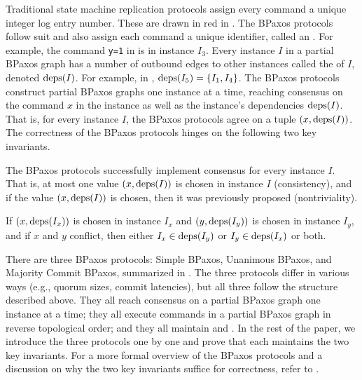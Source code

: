 Traditional state machine replication protocols assign every command a unique
integer log entry number. These are drawn in red in . The
BPaxos protocols follow suit and also assign each command a unique identifier,
called an . For example, the command \texttt{y=1} in
 is in instance $I_3$. Every instance $I$ in a partial BPaxos
graph has a number of outbound edges to other instances called the
 of $I$, denoted $\text{deps}(I)$. For example, in
, $\text{deps}(I_5) = \{I_1, I_4\}$.
%
The BPaxos protocols construct partial BPaxos graphs one instance at a time,
reaching consensus on the command $x$ in the instance as well as the instance's
dependencies $\text{deps}(I)$. That is, for every instance $I$, the BPaxos protocols
agree on a tuple $(x, \text{deps}(I))$.
%
The correctness of the BPaxos protocols hinges on the following two key
invariants.

\begin{invariant}
  The BPaxos protocols successfully implement consensus for every instance $I$.
  That is, at most one value $(x, \text{deps}(I))$ is chosen in instance $I$
  (consistency), and if the value $(x, \text{deps}(I))$ is chosen, then it was
  previously proposed (nontriviality).
\end{invariant}%
%
\begin{invariant}
  If $(x, \text{deps}(I_x))$ is chosen in instance $I_x$ and $(y, \text{deps}(I_y))$ is
  chosen in instance $I_y$, and if $x$ and $y$ conflict, then either $I_x \in
  \text{deps}(I_y)$ or $I_y \in \text{deps}(I_x)$ or both.
\end{invariant}

There are three BPaxos protocols: Simple BPaxos, Unanimous BPaxos, and Majority
Commit BPaxos, summarized in . The three protocols differ
in various ways (e.g., quorum sizes, commit latencies), but all
three follow the structure described above. They all reach consensus on a
partial BPaxos graph one instance at a time; they all execute commands in a
partial BPaxos graph in reverse topological order; and they all maintain  and
. In the rest of the paper, we introduce the
three protocols one by one and prove that each maintains the two key
invariants. For a more formal overview of the BPaxos protocols and a discussion
on why the two key invariants suffice for correctness, refer to
.

